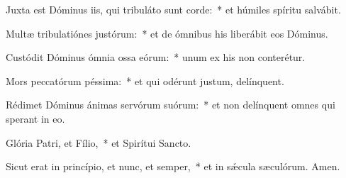 \item Juxta est Dóminus iis, qui tribuláto sunt corde:~* et húmiles spíritu salvábit.

\item Multæ tribulatiónes justórum:~* et de ómnibus his liberábit eos Dóminus.

\item Custódit Dóminus ómnia ossa eórum:~* unum ex his non conterétur.

\item Mors peccatórum péssima:~* et qui odérunt justum, delínquent.

\item Rédimet Dóminus ánimas servórum suórum:~* et non delínquent omnes qui sperant in eo.

\item Glória Patri, et Fílio,~* et Spirítui Sancto.

\item Sicut erat in princípio, et nunc, et semper,~* et in sǽcula sæculórum. Amen.

